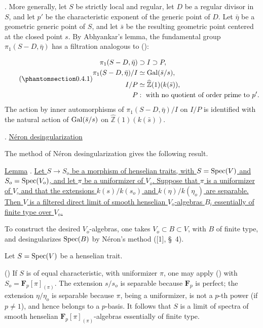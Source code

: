 . More generally, let $S$ be strictly local and regular, let $D$ be a regular divisor in $S$, and let $p'$ be the characteristic exponent of the generic point of $D$. Let $\bar\eta$ be a geometric generic point of $S$, and let $\bar s$ be the resulting geometric point centered at the closed point $s$. By Abhyankar's lemma, the fundamental group $\pi_1(S-D,\bar\eta)$ has a filtration analogous to ():

\begin{equation}\tag{\SGARefTarget{sga7.sga7i.ei.n0-4-1}{0.4.1}}
\begin{aligned}
\pi_1(S-D,\bar\eta)&\supset I\supset P,\\
\pi_1(S-D,\bar\eta)/I&\simeq\Gal(\bar s/s),\\
I/P&\simeq\widehat{\mathbb{Z}}(1)(k(\bar s)),\\
P&:\ \text{with no quotient of order prime to }p'.
\end{aligned}
\end{equation}
The action by inner automorphisms of $\pi_1(S-D,\bar\eta)/I$ on $I/P$ is identified with the natural action of $\operatorname{Gal}(\bar s/s)$ on $\widehat{\mathbb{Z}}(1)(k(\bar s))$.

. \underline{N\'eron desingularization}

The method of N\'eron desingularization gives the following result.

\underline{Lemma} . \underline{Let $S\longrightarrow S_o$ be a morphism of henselian traits, with $S=\operatorname{Spec}(V)$ and $S_o=\operatorname{Spec}(V_o)$, and let $\pi$ be a uniformizer of $V_o$. Suppose that $\pi$ is a uniformizer of $V$, and that the extensions $k(s)/k(s_o)$ and $k(\eta)/k(\eta_o)$ are separable. Then $V$ is a filtered direct limit of smooth henselian $V_o$-algebras $B_i$ essentially of finite type over $V_o$.}


To construct the desired $V_o$-algebras, one takes $V_o\subset B\subset V$, with $B$ of finite type, and desingularizes $\operatorname{Spec}(B)$ by N\'eron's method ([1], \S~4).

Let $S=\operatorname{Spec}(V)$ be a henselian trait.

() If $S$ is of equal characteristic, with uniformizer $\pi$, one may apply () with $S_o=\mathbf{F}_p[\pi]_{(\pi)}$. The extension $s/s_o$ is separable because $\mathbf{F}_p$ is perfect; the extension $\eta/\eta_o$ is separable because $\pi$, being a uniformizer, is not a $p$-th power (if $p\neq1$), and hence belongs to a $p$-basis. It follows that $S$ is a limit of spectra of smooth henselian $\mathbf{F}_p[\pi]_{(\pi)}$-algebras essentially of finite type.

